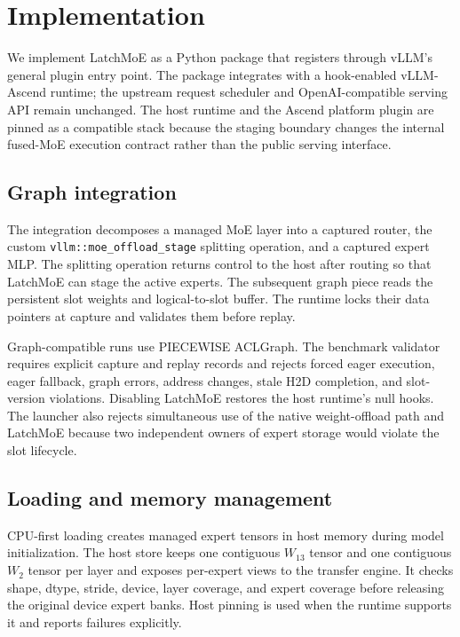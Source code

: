 \section{Implementation}
\label{sec:implementation}

We implement LatchMoE as a Python package that registers through vLLM's general
plugin entry point. The package integrates with a hook-enabled vLLM-Ascend
runtime; the upstream request scheduler and OpenAI-compatible serving API
remain unchanged. The host runtime and the Ascend platform plugin are pinned as
a compatible stack because the staging boundary changes the internal fused-MoE
execution contract rather than the public serving interface.

\subsection{Graph integration}

The integration decomposes a managed MoE layer into a captured router, the
custom \texttt{vllm::moe\_offload\_stage} splitting operation, and a captured
expert MLP. The splitting operation returns control to the host after routing
so that LatchMoE can stage the active experts. The subsequent graph piece reads
the persistent slot weights and logical-to-slot buffer. The runtime locks their
data pointers at capture and validates them before replay.

Graph-compatible runs use PIECEWISE ACLGraph. The benchmark validator requires
explicit capture and replay records and rejects forced eager execution, eager
fallback, graph errors, address changes, stale H2D completion, and slot-version
violations. Disabling LatchMoE restores the host runtime's null hooks. The
launcher also rejects simultaneous use of the native weight-offload path and
LatchMoE because two independent owners of expert storage would violate the
slot lifecycle.

\subsection{Loading and memory management}

CPU-first loading creates managed expert tensors in host memory during model
initialization. The host store keeps one contiguous $W_{13}$ tensor and one
contiguous $W_2$ tensor per layer and exposes per-expert views to the transfer
engine. It checks shape, dtype, stride, device, layer coverage, and expert
coverage before releasing the original device expert banks. Host pinning is
used when the runtime supports it and reports failures explicitly.

